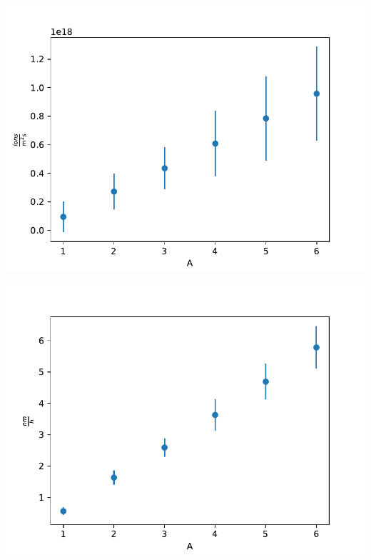 \documentclass{beamer} %
\begin{document}
\begin{frame}
\begin{minipage}{0.49\textwidth}
        \includegraphics[width=1.1\textwidth]{figures/CurrentVary_H2_100sccm_flux_werrors.pdf}
    \end{minipage}
    \begin{minipage}{0.49\textwidth}
        \includegraphics[width=1.1\textwidth]{figures/CurrentVary_H2_100sccm_worstcasesput_werrors.pdf}
    \end{minipage}
\end{frame}
\end{document}
